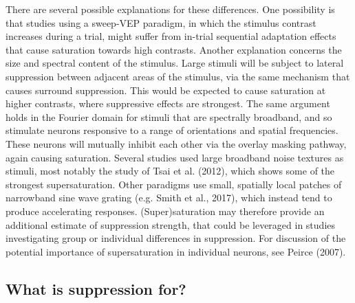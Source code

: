 \documentclass[]{article}
\begin{document}
There are several possible explanations for these differences. One possibility is that studies using a sweep-VEP paradigm, in which the stimulus contrast increases during a trial, might suffer from in-trial sequential adaptation effects that cause saturation towards high contrasts. Another explanation concerns the size and spectral content of the stimulus. Large stimuli will be subject to lateral suppression between adjacent areas of the stimulus, via the same mechanism that causes surround suppression. This would be expected to cause saturation at higher contrasts, where suppressive effects are strongest. The same argument holds in the Fourier domain for stimuli that are spectrally broadband, and so stimulate neurons responsive to a range of orientations and spatial frequencies. These neurons will mutually inhibit each other via the overlay masking pathway, again causing saturation. Several studies used large broadband noise textures as stimuli, most notably the study of Tsai et al. (2012), which shows some of the strongest supersaturation. Other paradigms use small, spatially local patches of narrowband sine wave grating (e.g. Smith et al., 2017), which instead tend to produce accelerating responses. (Super)saturation may therefore provide an additional estimate of suppression strength, that could be leveraged in studies investigating group or individual differences in suppression. For discussion of the potential importance of supersaturation in individual neurons, see Peirce (2007).

\hypertarget{what-is-suppression-for}{%
\subsection{What is suppression for?}\label{what-is-suppression-for}}
\end{document}
